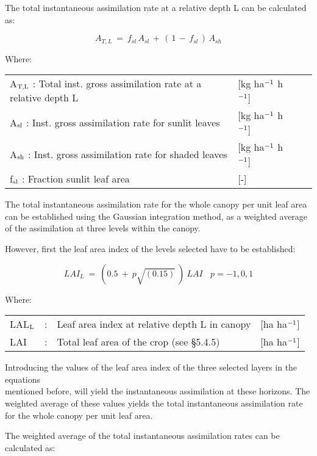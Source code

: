 The total instantaneous assimilation rate at a relative depth L can be calculated as:

\begin{equation}
A _{T,L} ~=~ f _{sl} \, A _{sl} \, +\, (\, 1\, -\, f _{sl} \, )\, A _{sh} 
\end{equation}

Where:\\
\begin{tabularx}{\textwidth}{llXr}
A$_{{\rm T,L}}$ : Total inst. gross assimilation rate at a relative depth L   &
     [kg ha$^{{\rm -1}}$ h$^{{\rm -1}}$]\\
A$_{{\rm sl}}$ : Inst. gross assimilation rate for sunlit leaves  & [kg ha$^{{\rm -1}}$ h$^{{\rm -1}}$]\\
A$_{{\rm sh}}$ : Inst. gross assimilation rate for shaded leaves  & [kg ha$^{{\rm -1}}$ h$^{{\rm -1}}$]\\
f$_{{\rm sl}}$ : Fraction sunlit leaf area  &  [-]\\
\end{tabularx}

The total instantaneous assimilation rate for the whole canopy per unit leaf area can be
established using the Gaussian integration method, as a weighted average of the assimila\-tion at three levels within the canopy.

However, first the leaf area index of the levels selected have to be established:

\begin{equation}
LAI _{L} ~=~ (0.5~+~p \sqrt{(0.15)} ~)~LAI~~~~p=-1,0,1
\end{equation}

Where:\\
\begin{tabularx}{\textwidth}{llXr}
LAL$_{{\rm L}}$ &:& Leaf area index at relative depth L in canopy    &    [ha ha$^{{\rm -1}}$]\\
LAI &:& Total leaf area of the crop    (see \S 5.4.5) &   [ha ha$^{{\rm -1}}$]\\
\end{tabularx}

Introducing the values of the leaf area index of the three selected layers in the equations\\
mentioned before, will yield the instantaneous assimilation at these horizons. The
weighted average of these values yields the total instantaneous assimilation rate for the
whole canopy per unit leaf area.

The weighted average of the total instanta\-neous assimilation rates can be calculated as:

